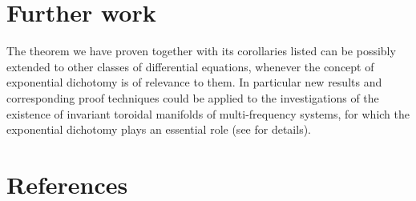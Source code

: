 \documentclass{elsarticle}
\theoremstyle{remark}
\begin{document}
\section{Further work}
The theorem we have proven together with its corollaries listed can be possibly extended to other classes of differential equations,
whenever the concept of exponential dichotomy is of relevance to them. In particular new results and corresponding proof techniques
could be applied to the investigations of the existence of invariant toroidal manifolds of multi-frequency systems, for
 which the exponential dichotomy plays an essential role (see \cite{samoilenko2012elements,mitropolsky2002dichotomies} for details).
\section*{References}

\end{document}
